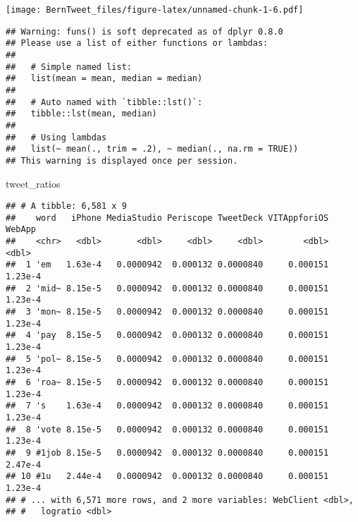 \documentclass[]{article}
\newenvironment{Shaded}{\begin{snugshade}}{\end{snugshade}}
\newcommand{\CommentTok}[1]{\textcolor[rgb]{0.56,0.35,0.01}{\textit{#1}}}
\newcommand{\DataTypeTok}[1]{\textcolor[rgb]{0.13,0.29,0.53}{#1}}
\newcommand{\DecValTok}[1]{\textcolor[rgb]{0.00,0.00,0.81}{#1}}
\newcommand{\KeywordTok}[1]{\textcolor[rgb]{0.13,0.29,0.53}{\textbf{#1}}}
\newcommand{\NormalTok}[1]{#1}
\newcommand{\OperatorTok}[1]{\textcolor[rgb]{0.81,0.36,0.00}{\textbf{#1}}}
\newcommand{\StringTok}[1]{\textcolor[rgb]{0.31,0.60,0.02}{#1}}
\begin{document}
\texttt{[image: BernTweet\_files/figure-latex/unnamed-chunk-1-6.pdf]}

\begin{Shaded}
\end{Shaded}

\begin{verbatim}
## Warning: funs() is soft deprecated as of dplyr 0.8.0
## Please use a list of either functions or lambdas: 
## 
##   # Simple named list: 
##   list(mean = mean, median = median)
## 
##   # Auto named with `tibble::lst()`: 
##   tibble::lst(mean, median)
## 
##   # Using lambdas
##   list(~ mean(., trim = .2), ~ median(., na.rm = TRUE))
## This warning is displayed once per session.
\end{verbatim}

\begin{Shaded}
\begin{Highlighting}[]
\NormalTok{tweet_ratios}
\end{Highlighting}
\end{Shaded}

\begin{verbatim}
## # A tibble: 6,581 x 9
##    word   iPhone MediaStudio Periscope TweetDeck VITAppforiOS  WebApp
##    <chr>   <dbl>       <dbl>     <dbl>     <dbl>        <dbl>   <dbl>
##  1 'em   1.63e-4   0.0000942  0.000132 0.0000840     0.000151 1.23e-4
##  2 'mid~ 8.15e-5   0.0000942  0.000132 0.0000840     0.000151 1.23e-4
##  3 'mon~ 8.15e-5   0.0000942  0.000132 0.0000840     0.000151 1.23e-4
##  4 'pay  8.15e-5   0.0000942  0.000132 0.0000840     0.000151 1.23e-4
##  5 'pol~ 8.15e-5   0.0000942  0.000132 0.0000840     0.000151 1.23e-4
##  6 'roa~ 8.15e-5   0.0000942  0.000132 0.0000840     0.000151 1.23e-4
##  7 's    1.63e-4   0.0000942  0.000132 0.0000840     0.000151 1.23e-4
##  8 'vote 8.15e-5   0.0000942  0.000132 0.0000840     0.000151 1.23e-4
##  9 #1job 8.15e-5   0.0000942  0.000132 0.0000840     0.000151 2.47e-4
## 10 #1u   2.44e-4   0.0000942  0.000132 0.0000840     0.000151 1.23e-4
## # ... with 6,571 more rows, and 2 more variables: WebClient <dbl>,
## #   logratio <dbl>
\end{verbatim}
\end{document}
